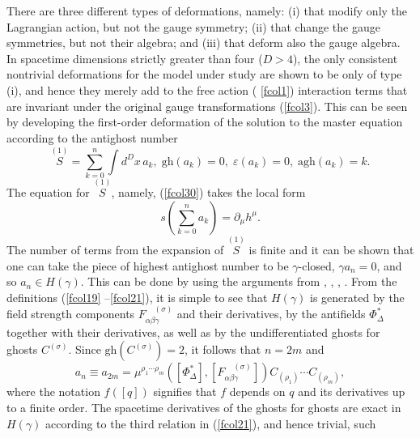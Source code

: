 \documentclass[a4paper,12pt]{article}
\begin{document}
There are three different types of deformations, namely: (i) that modify
only the Lagrangian action, but not the gauge symmetry; (ii) that change the
gauge symmetries, but not their algebra; and (iii) that deform also the
gauge algebra. In spacetime dimensions strictly greater than four ($D>4$),
the only consistent nontrivial deformations for the model under study are
shown to be only of type (i), and hence they merely add to the free action (%
\ref{fcol1}) interaction terms that are invariant under the original gauge
transformations (\ref{fcol3}). This can be seen by developing the
first-order deformation of the solution to the master equation according to
the antighost number 
\begin{equation}
\stackrel{(1)}{S}=\sum_{k=0}^{n}\int d^{D}x\,a_{k},\;\mathrm{gh}\left(
a_{k}\right) =0,\;\varepsilon \left( a_{k}\right) =0,\;\mathrm{agh}\left(
a_{k}\right) =k.  \label{fcoli1}
\end{equation}
The equation for $\stackrel{(1)}{S}$, namely, (\ref{fcol30}) takes the local
form 
\begin{equation}
s\left( \sum_{k=0}^{n}a_{k}\right) =\partial _{\mu }h^{\mu }.  \label{fcoli2}
\end{equation}
The number of terms from the expansion of $\stackrel{(1)}{S}$ is finite and
it can be shown that one can take the piece of highest antighost number to
be $\gamma $-closed, $\gamma a_{n}=0$, and so $a_{n}\in H\left( \gamma
\right) $. This can be done by using the arguments from \cite{7and23}, \cite
{23and6}, \cite{32and12}, \cite{36and14}. From the definitions (\ref{fcol19}%
--\ref{fcol21}), it is simple to see that $H\left( \gamma \right) $ is
generated by the field strength components $F_{\alpha \beta \gamma
}^{\;\;\;\;(\sigma )}$ and their derivatives, by the antifields $\Phi
_{\Delta }^{*}$ together with their derivatives, as well as by the
undifferentiated ghosts for ghosts $C^{(\sigma )}$. Since $\mathrm{gh}\left(
C^{(\sigma )}\right) =2$, it follows that $n=2m$ and 
\begin{equation}
a_{n}\equiv a_{2m}=\mu ^{\rho _{1}\cdots \rho _{m}}\left( \left[ \Phi
_{\Delta }^{*}\right] ,\left[ F_{\alpha \beta \gamma }^{\;\;\;\;(\sigma
)}\right] \right) C_{(\rho _{1})}\cdots C_{(\rho _{m})},  \label{fcoli3}
\end{equation}
where the notation $f\left( \left[ q\right] \right) $ signifies that $f$
depends on $q$ and its derivatives up to a finite order. The spacetime
derivatives of the ghosts for ghosts are exact in $H\left( \gamma \right) $
according to the third relation in (\ref{fcol21}), and hence trivial, such
\end{document}
